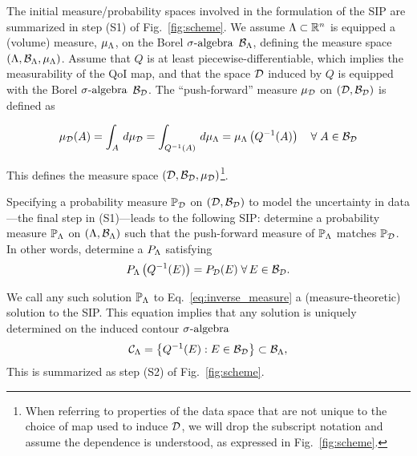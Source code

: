 
The initial measure/probability spaces involved in the formulation of the SIP are summarized in step (S1) of Fig.~\ref{fig:scheme}. 
We assume $\Lambda\subset \mathbb{R}^n$ is equipped a (volume) measure, $\mu_{\Lambda}$, on the Borel $\sigma\text{-algebra}$ $\mathcal{B}_{\Lambda}$, defining the measure space $(\Lambda, \mathcal{B}_{\Lambda}, \mu_{\Lambda})$.
Assume that $Q$ is at least piecewise-differentiable, which implies the measurability of the QoI map, and that the space $\mathcal{D}$ induced by $Q$ is equipped with the Borel $\sigma\text{-algebra}$ $\mathcal{B}_{\mathcal{D}}$.
The ``push-forward'' measure $\mu_{\mathcal{D}}$ on ${(\mathcal{D}, \mathcal{B}_{\mathcal{D}})}$ is defined as 

\begin{equation}\label{eq:dataspace_pushforward_measure}
\mu_{\mathcal{D}} (A) = \int_A \, d\mu_{\mathcal{D}} = \int_{Q^{-1}(A)} \, d\mu_{\Lambda} = \mu_{\Lambda} \left (Q^{-1}(A) \right ) \quad \forall \;  A\in\mathcal{B}_{\mathcal{D}}
\end{equation}

This defines the measure space $(\mathcal{D}, \mathcal{B}_{\mathcal{D}}, \mu_{\mathcal{D}})$\footnote{When referring to properties of the data space that are not unique to the choice of map used to induce $\mathcal{D}$, we will drop the subscript notation and assume the dependence is understood, as expressed in Fig.~\ref{fig:scheme}.}.

Specifying a probability measure $\mathbb{P}_{\mathcal{D}}$ on ${(\mathcal{D}, \mathcal{B}_{\mathcal{D}})}$ to model the uncertainty in data\----the final step in (S1)\----leads to the following SIP: determine a probability measure $\mathbb{P}_\Lambda$ on ${(\Lambda, \mathcal{B}_{\Lambda})}$ such that the push-forward measure of $\mathbb{P}_\Lambda$ matches $\mathbb{P}_{\mathcal{D}}$. 
In other words, determine a $P_\Lambda$ satisfying
\begin{equation}\label{eq:inverse_measure}
P_\Lambda \left ( Q^{-1}(E)\right ) = P_{\mathcal{D}}(E) \; \forall \, E \in \mathcal{B}_{\mathcal{D}}.
\end{equation}

We call any such solution $\mathbb{P}_\Lambda$ to Eq.~\eqref{eq:inverse_measure} a (measure-theoretic) solution to the SIP.
This equation implies that any solution is uniquely determined on the induced contour $\sigma\text{-algebra}$ 
\begin{equation}\label{eq:contour_sa}
\mathcal{C}_\Lambda = \left\{Q^{-1}(E) : E \in \mathcal{B}_{\mathcal{D}} \right\} \subset \mathcal{B}_{\Lambda},
\end{equation}
This is summarized as step (S2) of Fig.~\ref{fig:scheme}. 


